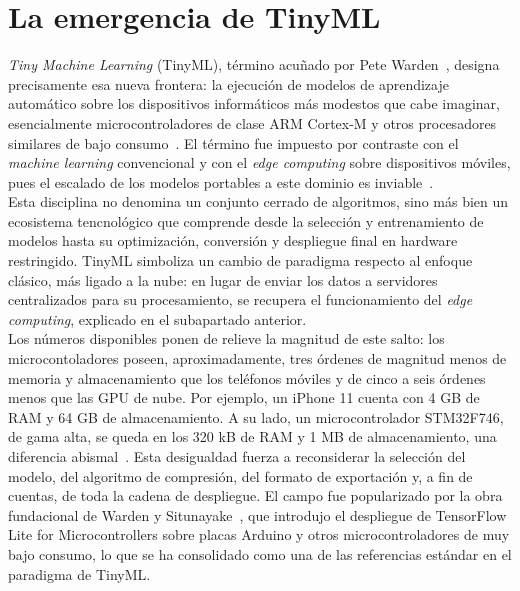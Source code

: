 \documentclass[a4paper,12pt,twoside,final]{book}
\begin{document}
\section{La emergencia de TinyML}
\textit{Tiny Machine Learning} (TinyML), término acuñado por Pete Warden~\cite{warden-situnayake2020tinyml},
designa precisamente esa nueva frontera: la ejecución de modelos de aprendizaje automático sobre los dispositivos
informáticos más modestos que cabe imaginar, esencialmente microcontroladores de clase ARM Cortex-M y otros
procesadores similares de bajo consumo~\cite{ray2022kingsaud,lin2023ieeemcas,abadade2023ieeeaccess}. El término fue
impuesto por contraste con el \textit{machine learning} convencional y con el \textit{edge computing} sobre
dispositivos móviles, pues el escalado de los modelos portables a este dominio es inviable~\cite{lin2023ieeemcas}.\\

Esta disciplina no denomina un conjunto cerrado de algoritmos, sino más bien un ecosistema tencnológico que comprende
desde la selección y entrenamiento de modelos hasta su optimización, conversión y despliegue final en hardware
restringido. TinyML simboliza un cambio de paradigma respecto al enfoque clásico, más ligado a la nube: en
lugar de enviar los datos a servidores centralizados para su procesamiento, se recupera el funcionamiento del
\textit{edge computing}, explicado en el subapartado anterior.\\

Los números disponibles ponen de relieve la magnitud de este salto: los microcontoladores poseen, aproximadamente,
tres órdenes de magnitud menos de memoria y almacenamiento que los teléfonos móviles y de cinco a seis órdenes menos
que las GPU de nube. Por ejemplo, un iPhone 11 cuenta con 4 GB de RAM y 64 GB de almacenamiento. A su lado,
un microcontrolador STM32F746, de gama alta, se queda en los 320 kB de RAM y 1 MB de almacenamiento, una diferencia
abismal~\cite{lin2023ieeemcas}. Esta desigualdad fuerza a reconsiderar la selección del modelo, del algoritmo de
compresión, del formato de exportación y, a fin de cuentas, de toda la cadena de despliegue. El campo fue
popularizado por la obra fundacional de Warden y Situnayake~\cite{warden-situnayake2020tinyml}, que introdujo el
despliegue de TensorFlow Lite for Microcontrollers sobre placas Arduino y otros microcontroladores de muy bajo
consumo, lo que se ha consolidado como una de las referencias estándar en el paradigma de TinyML.\\
\end{document}
